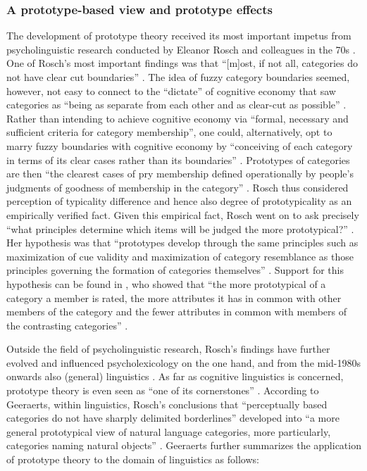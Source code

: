\subsubsection{A prototype-based view and prototype effects}
\label{sec:2.4.3.1}  
The development of prototype theory received its most important impetus from psycholinguistic research conducted by Eleanor Rosch and colleagues in the 70s \citep{rosch_cognitive_1975,Rosch1978,margolis_principles_1999,rosch_family_1975}. One of Rosch’s most important findings was that “[m]ost, if not all, categories do not have clear cut boundaries” \citep[196]{margolis_principles_1999}. The idea of fuzzy category boundaries seemed, however, not easy to connect to the ``dictate'' of cognitive economy that saw categories as “being as separate from each other and as clear-cut as possible” \citep[196]{margolis_principles_1999}. Rather than intending to achieve cognitive economy via “formal, necessary and sufficient criteria for category membership”, one could, alternatively, opt to marry fuzzy boundaries with cognitive economy by “conceiving of each category in terms of its clear cases rather than its boundaries” \citep[196]{margolis_principles_1999}. Prototypes of categories are then “the clearest cases of pry membership defined operationally by people’s judgments of goodness of membership in the category” \citep{margolis_principles_1999}. Rosch thus considered perception of typicality difference and hence also degree of prototypicality as an empirically verified fact. Given this empirical fact, Rosch went on to ask precisely “what principles determine which items will be judged the more prototypical?” \citep[197]{margolis_principles_1999}. Her hypothesis was that “prototypes develop through the same principles such as maximization of cue validity and maximization of category resemblance as those principles governing the formation of categories themselves” \citep{margolis_principles_1999}. Support for this hypothesis can be found in \citet{rosch_family_1975}, who showed that “the more prototypical of a category a member is rated, the more attributes it has in common with other members of the category and the fewer attributes in common with members of the contrasting categories” \citep[197]{margolis_principles_1999}.

Outside the field of psycholinguistic research, Rosch’s findings have further evolved and influenced psycholexicology on the one hand, and from the mid-1980s onwards also (general) linguistics \citep[578]{allan_lexical_2013}. As far as cognitive linguistics is concerned, prototype theory is even seen as “one of its cornerstones” \citep[145]{Geeraerts2006}. According to Geeraerts, within linguistics, Rosch’s conclusions that “perceptually based categories do not have sharply delimited borderlines” developed into “a more general prototypical view of natural language categories, more particularly, categories naming natural objects” \citep[578]{allan_lexical_2013}. Geeraerts further summarizes the application of prototype theory to the domain of linguistics as follows:

